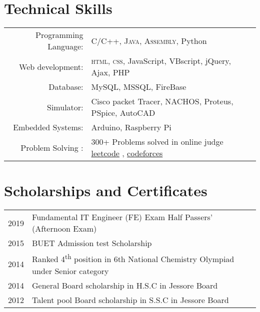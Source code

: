 \documentclass[a4paper,10pt]{article}
\begin{document}
\section{Technical Skills}
\begin{tabular}{rl}
 Programming Language:& \textsc{C/C++}, \textsc{Java}, \textsc{Assembly}, Python\\
Web development:& \textsc{html}, \textsc{css}, JavaScript, VBscript, jQuery, Ajax, PHP\\
Database: & MySQL, MSSQL, FireBase\\
Simulator: & Cisco packet Tracer, NACHOS, Proteus, PSpice, AutoCAD\\
Embedded Systems: & Arduino, Raspberry Pi \\
Problem Solving :& 300+ Problems solved in online judge
\href{https://leetcode.com/an1ndya}{leetcode} ,
\href{https://codeforces.com/profile/an1ndya}{codeforces}     \\
\end{tabular}

\section{Scholarships and Certificates}
\begin{tabular}{rl}
2019 &  Fundamental IT Engineer (FE) Exam Half Passers’ (Afternoon Exam)\\
 2015 & BUET Admission test Scholarship\\
 2014 &  Ranked 4\textsuperscript{th} position in 6th National Chemistry Olympiad under Senior category \\
 2014 & General Board scholarship in H.S.C in Jessore Board \\
 2012 & Talent pool Board scholarship in S.S.C in Jessore Board\\
\end{tabular}
\end{document}
